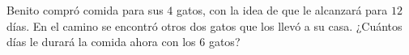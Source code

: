 Benito compró comida para sus $4$ gatos, con la idea de que le alcanzará para $12$ días. En el camino se encontró otros dos gatos que los llevó a su casa. ¿Cuántos días le durará la comida ahora con los $6$ gatos?